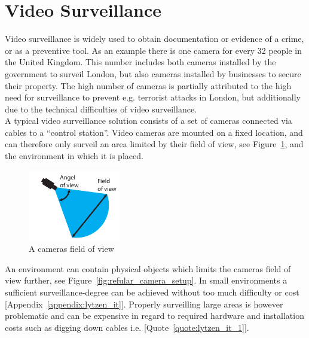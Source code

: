 \section{Video Surveillance}\label{sec:video_surveillance}
Video surveillance is widely used to obtain documentation or evidence of a crime, or as a preventive tool.
As an example there is one camera for every 32 people in the United Kingdom\citep{london_camera_surveillance}.
This number includes both cameras installed by the government to surveil London, but also cameras installed by businesses to secure their property.
The high number of cameras is partially attributed to the high need for surveillance to prevent e.g. terrorist attacks in London, but additionally due to the technical difficulties of video surveillance. \\

A typical video surveillance solution consists of a set of cameras connected via cables to a ``control station''.
Video cameras are mounted on a fixed location, and can therefore only surveil an area limited by their field of view, see Figure~\ref{fig:camera_properties}, and the environment in which it is placed.\\

\begin{figure}[htb]
    \centering
    \includegraphics[scale=1.8]{gfx/camera_properties.pdf}
    \caption{A cameras field of view}
    \label{fig:camera_properties}
\end{figure}

An environment can contain physical objects which limits the cameras field of view further, see Figure~\ref{fig:refular_camera_setup}.
In small environments a sufficient surveillance-degree can be achieved without too much difficulty or cost [Appendix~\ref{appendix:lytzen_it}].
Properly surveilling large areas is however problematic and can be expensive in regard to required hardware and installation costs such as digging down cables i.e. [Quote~\ref{quote:lytzen_it_1}].





